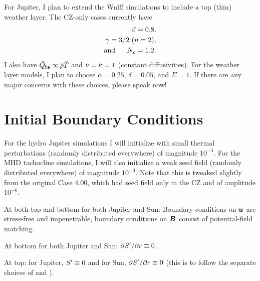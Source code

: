 \documentclass[12pt]{article}
\numberwithin{equation}{section}
\begin{document}
For Jupiter, I plan to extend the Wulff simulations to include a top (thin) weather layer. The CZ-only cases currently have 
 \begin{subequations}
	\begin{align}
		\beta=0.8,\\
		\gamma =3/2\ (n=2),\\
		\text{and}\ \ \ \ \  N_\rho = 1.2.
	\end{align}
\end{subequations}
I also have $\tilde{Q}_{\texttt{Ra}}\propto \tilde{\rho}\tilde{T}$ and $\tilde{\nu}=\tilde{\kappa}=1$ (constant diffusivities). For the weather layer models, I plan to choose $\alpha=0.25$, $\delta=0.05$, and $\Sigma=1$. If there are any major concerns with these choices, please speak now! 

\section{Initial Boundary Conditions}
For the hydro Jupiter simulations I will initialize with small thermal perturbations (randomly distributed everywhere) of magnitude $10^{-3}$. For the MHD tachocline simulations, I will also initialize a weak seed field (randomly distributed everywhere) of magnitude $10^{-3}$. Note that this is tweaked slightly from the original Case 4.00, which had seed field only in the CZ and of amplitude $10^{-6}$. 

At both top and bottom for both Jupiter and Sun: Boundary conditions on $\bm{u}$ are stress-free and impenetrable, boundary conditions on $\bm{B}$ consist of potential-field matching. 

At bottom for both Jupiter and Sun: $\partial{S^\prime}/\partial r\equiv0$. 

At top: for Jupiter, ${S^\prime}\equiv0$ and for Sun, $\partial{S^\prime}/\partial r\equiv0$ (this is to follow the separate choices of \citealt{Wulff2022} and \citealt{Matilsky2024}). 

\clearpage
\newpage
%
	
\end{document}
